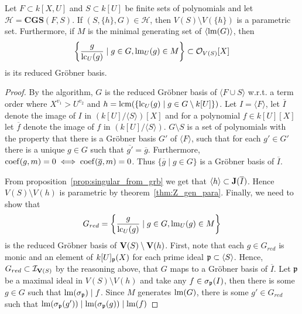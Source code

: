 \begin{theorem}\label{thm:segs_are_para}
  Let $F \subset k[X, U]$ and $S \subset k[U]$ be finite sets of polynomials and let $\mathcal H = \mathbf{CGS}(F, S)$. If $(S, \{h\}, G) \in \mathcal H$, then $V(S) \setminus V(\{h\})$ is a parametric set. Furthermore, if $M$ is the minimal generating set of $\langle \operatorname{lm}(G) \rangle$, then
  \[\left\{\frac g {\operatorname{lc}_{U}(g)} \mid g \in G, \operatorname{lm}_{U}(g) \in M \right\} \subset \mathcal O_{V(S)}[X]\]
  is its reduced Gröbner basis.
\end{theorem}
\begin{proof}
  By the algorithm, $G$ is the reduced Gröbner basis of $\langle F \cup S \rangle$ w.r.t. a term order where $X^{v_{1}} > U^{v_{2}}$ and $h = \operatorname{lcm}(\{\operatorname{lc}_{U}(g) \mid g \in G \setminus k[U]\})$. Let $I = \langle F \rangle$, let $\overline I$ denote the image of $I$ in $(k[U]/\langle S \rangle)[X]$ and for a polynomial $f \in k[U][X]$ let $\overline f$ denote the image of $f$ in $(k[U]/\langle S \rangle)$. $G \setminus S$ is a set of polynomials with the property that there is a Gröbner basis $G'$ of $\langle F \rangle$, such that for each $g' \in G'$ there is a unique $g \in G$ such that $\overline{g'} = \overline g$. Furthermore, $\operatorname{coef}(g, m) = 0 \iff \operatorname{coef}(\overline g, m) = 0$. Thus $\{\overline g \mid g \in G\}$ is a Gröbner basis of $\overline I$.

  From proposition~\ref{prop:singular_from_grb} we get that $\langle h \rangle \subset \operatorname{\mathbf J}(\overline I)$. Hence $V(S) \setminus V(h)$ is parametric by theorem~\ref{thm:Z_gen_para}. Finally, we need to show that
  \[G_{red} = \left\{ \frac g {\operatorname{lc}_{U}(g)} \mid g \in G, \operatorname{lm}_{U}(g) \in M \right\}\] is the reduced Gröbner basis of $\operatorname{\mathbf V}(S) \setminus \operatorname{\mathbf V}(h)$. First, note that each $g \in G_{red}$ is monic and an element of $k[U]_{\mathfrak p}(X)$ for each prime ideal $\mathfrak p \subset \langle S \rangle$. Hence, $G_{red} \subset \mathcal I_{\operatorname{\mathbf V}(S)}$ by the reasoning above, that $G$ maps to a Gröbner basis of $\overline I$. Let $\mathfrak p$ be a maximal ideal in $V(S) \setminus V(h)$ and take any $f \in \sigma_{\mathfrak p}(I)$, then there is some $g \in G$ such that $\operatorname{lm}(\sigma_{\mathfrak p}) \mid f$. Since $M$ generates $\operatorname{lm}(G)$, there is some $g' \in G_{red}$ such that $\operatorname{lm}(\sigma_{\mathfrak p}(g')) \mid \operatorname{lm}(\sigma_{\mathfrak p}(g)) \mid \operatorname{lm}(f)$
\end{proof}
